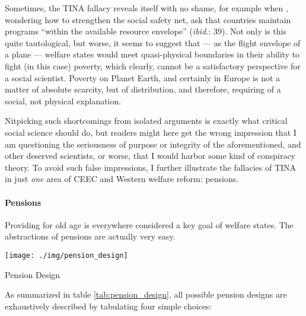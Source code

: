 \documentclass[11pt,a4paper,oneside,openright]{article}
\begin{document}
Sometimes, the TINA fallacy reveals itself with no shame, for example when \cite{Grow2005}, wondering how to strengthen the social safety net, ask that countries maintain programs ``within the available resource envelope'' (\emph{ibid.}: 39). Not only is this quite tautological, but worse, it seems to suggest that --- as the flight envelope of a plane --- welfare states would meet quasi-physical boundaries in their ability to fight (in this case) poverty, which clearly, cannot be a satisfactory perspective for a social scientist. Poverty on Planet Earth, and certainly in Europe is not a matter of absolute scarcity, but of distribution, and therefore, requiring of a social, not physical explanation.

Nitpicking such shortcomings from isolated arguments is exactly what critical social science should do, but readers might here get the wrong impression that I am questioning the seriousness of purpose or integrity of the aforementioned, and other deserved scientists, or worse, that I would harbor some kind of conspiracy theory. To avoid such false impressions, I further illustrate the fallacies of TINA in just \emph{one} area of \gls{CEEC} and Western welfare reform: pensions. %

\paragraph{Pensions}  \label{sec:pensions}
Providing for old age is everywhere considered a key goal of welfare states. The abstractions of pensions are actually very easy. 

 \begin{table}[htbp]
	\centering
	\texttt{[image: ./img/pension\_design]}  
	\caption{Pension Design}
	\label{tab:pension_design}
\end{table}%

As summarized in table \ref{tab:pension_design}, all possible pension designs are exhaustively described by tabulating four simple choices:
\end{document}
